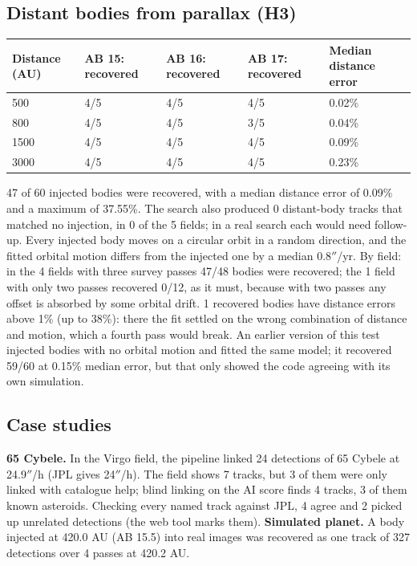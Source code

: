 \documentclass[twocolumn]{aastex631}
\begin{document}
\subsection{Distant bodies from parallax (H3)}
\begin{table}[t]
\centering
\footnotesize

\begin{tabular}{lllll}
\hline\hline
Distance (AU) & AB 15: recovered & AB 16: recovered & AB 17: recovered & Median distance error \\
\hline
500 & 4/5 & 4/5 & 4/5 & 0.02\% \\
800 & 4/5 & 4/5 & 3/5 & 0.04\% \\
1500 & 4/5 & 4/5 & 4/5 & 0.09\% \\
3000 & 4/5 & 4/5 & 4/5 & 0.23\% \\
\hline
\end{tabular}
\end{table}
47 of 60 injected bodies were recovered, with a median distance error of 0.09\% and a maximum of 37.55\%. The search also produced 0 distant-body tracks that matched no injection, in 0 of the 5 fields; in a real search each would need follow-up. Every injected body moves on a circular orbit in a random direction, and the fitted orbital motion differs from the injected one by a median 0.8$''$/yr. By field: in the 4 fields with three survey passes 47/48 bodies were recovered; the 1 field with only two passes recovered 0/12, as it must, because with two passes any offset is absorbed by some orbital drift. 1 recovered bodies have distance errors above 1\% (up to 38\%): there the fit settled on the wrong combination of distance and motion, which a fourth pass would break. An earlier version of this test injected bodies with no orbital motion and fitted the same model; it recovered 59/60 at 0.15\% median error, but that only showed the code agreeing with its own simulation.

\subsection{Case studies}
\textbf{65 Cybele.} In the Virgo field, the pipeline linked 24 detections of 65 Cybele at 24.9$''$/h (JPL gives 24$''$/h). The field shows 7 tracks, but 3 of them were only linked with catalogue help; blind linking on the AI score finds 4 tracks, 3 of them known asteroids. Checking every named track against JPL, 4 agree and 2 picked up unrelated detections (the web tool marks them). \textbf{Simulated planet.} A body injected at 420.0 AU (AB 15.5) into real images was recovered as one track of 327 detections over 4 passes at 420.2 AU.
\end{document}
